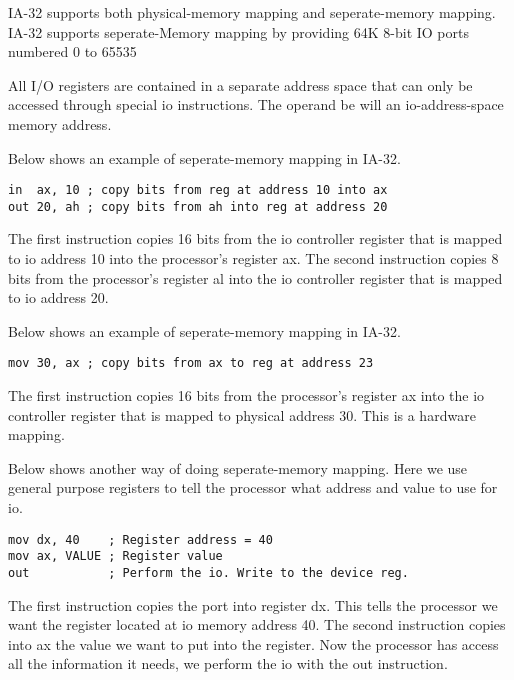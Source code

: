 IA-32 supports both physical-memory mapping and seperate-memory mapping. 
IA-32 supports seperate-Memory mapping by providing
64K 8-bit IO ports numbered 0 to 65535



All I/O registers are contained in a separate address space that can 
only be accessed through special io instructions. 
The operand be will an io-address-space memory address.

\begin{example}
Below shows an example of seperate-memory mapping in IA-32.

\begin{lstlisting}
in  ax, 10 ; copy bits from reg at address 10 into ax
out 20, ah ; copy bits from ah into reg at address 20
\end{lstlisting}
The first instruction copies 16 bits from the io controller register
that is mapped to io address 10 into the processor's register ax. 
The second instruction copies 8 bits from the processor's register al
into the io controller register that is mapped to io address 20. 

\end{example}

\begin{example}
Below shows an example of seperate-memory mapping in IA-32.

\begin{lstlisting}
mov 30, ax ; copy bits from ax to reg at address 23
\end{lstlisting}
The first instruction copies 16 bits from the processor's register ax
into the io controller register that is mapped to physical address 30. 
This is a hardware mapping.
\end{example}

\begin{example}
Below shows another way of doing seperate-memory mapping.
Here we use general purpose registers to tell the processor 
what address and value to use for io.
\begin{lstlisting}
mov dx, 40    ; Register address = 40
mov ax, VALUE ; Register value
out           ; Perform the io. Write to the device reg.
\end{lstlisting}
The first instruction copies the port into register dx. 
This tells the processor we want the register located at 
io memory address 40. The second instruction copies 
into ax the value we want to put into the register.
Now the processor has access all the information it needs, 
we perform the io with the out instruction. 
\end{example}


